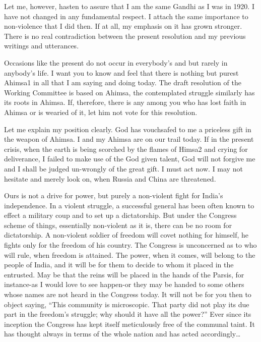 \documentclass[a4paper]{amsbook}
\begin{document}
Let me, however, hasten to assure that I am the same Gandhi as I was in 1920. I have not changed in any fundamental respect. I attach the same importance to non-violence that I did then. If at all, my emphasis on it has grown stronger. There is no real contradiction between the present resolution and my previous writings and utterances.

Occasions like the present do not occur in everybody's and but rarely in anybody's life. I want you to know and feel that there is nothing but purest Ahimsa1 in all that I am saying and doing today. The draft resolution of the Working Committee is based on Ahimsa, the contemplated struggle similarly has its roots in Ahimsa. If, therefore, there is any among you who has lost faith in Ahimsa or is wearied of it, let him not vote for this resolution.

Let me explain my position clearly. God has vouchsafed to me a priceless gift in the weapon of Ahimsa. I and my Ahimsa are on our trail today. If in the present crisis, when the earth is being scorched by the flames of Himsa2 and crying for deliverance, I failed to make use of the God given talent, God will not forgive me and I shall be judged un-wrongly of the great gift. I must act now. I may not hesitate and merely look on, when Russia and China are threatened.

Ours is not a drive for power, but purely a non-violent fight for India's independence. In a violent struggle, a successful general has been often known to effect a military coup and to set up a dictatorship. But under the Congress scheme of things, essentially non-violent as it is, there can be no room for dictatorship. A non-violent soldier of freedom will covet nothing for himself, he fights only for the freedom of his country. The Congress is unconcerned as to who will rule, when freedom is attained. The power, when it comes, will belong to the people of India, and it will be for them to decide to whom it placed in the entrusted. May be that the reins will be placed in the hands of the Parsis, for instance-as I would love to see happen-or they may be handed to some others whose names are not heard in the Congress today. It will not be for you then to object saying, “This community is microscopic. That party did not play its due part in the freedom's struggle; why should it have all the power?” Ever since its inception the Congress has kept itself meticulously free of the communal taint. It has thought always in terms of the whole nation and has acted accordingly\ldots
\end{document}
